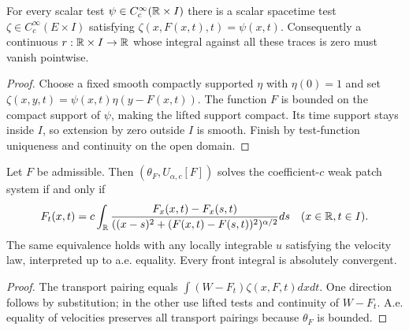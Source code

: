 \begin{lemma}
  \label{lem:c13_trace_tests}
  For every scalar test $\psi\in C_c^\infty(\mathbb{R}\times I)$ there is a scalar spacetime test
  $\zeta\in C_c^\infty(E\times I)$ satisfying $\zeta(x,F(x,t),t)=\psi(x,t)$.
  Consequently a continuous $r:\mathbb{R}\times I\to\mathbb{R}$ whose integral against all these traces is zero
  must vanish pointwise.
\end{lemma}
\begin{proof}
  Choose a fixed smooth compactly supported $\eta$ with $\eta(0)=1$ and set
  $\zeta(x,y,t)=\psi(x,t)\eta(y-F(x,t))$. The function $F$ is bounded on the compact
  support of $\psi$, making the lifted support compact. Its time support stays inside $I$,
  so extension by zero outside $I$ is smooth. Finish by test-function uniqueness
  and continuity on the open domain.
\end{proof}

\begin{theorem}
  \label{thm:c13_patch_front_equivalence}
  Let $F$ be admissible. Then $(\theta_F,U_{\alpha,c}[F])$ solves the coefficient-$c$ weak patch
  system if and only if
  \[
    F_t(x,t)=c\int_{\mathbb{R}}
      \frac{F_x(x,t)-F_x(s,t)}{((x-s)^2+(F(x,t)-F(s,t))^2)^{\alpha/2}}ds
      \quad(x\in\mathbb{R},t\in I).
  \]
  The same equivalence holds with any locally integrable $u$ satisfying the velocity law,
  interpreted up to a.e. equality. Every front integral is absolutely convergent.
\end{theorem}
\begin{proof}
  The transport pairing equals $\int(W-F_t)\zeta(x,F,t)dxdt$.
  One direction follows by substitution; in the other use lifted tests and continuity of $W-F_t$.
  A.e. equality of velocities preserves all transport pairings because $\theta_F$ is bounded.
\end{proof}

